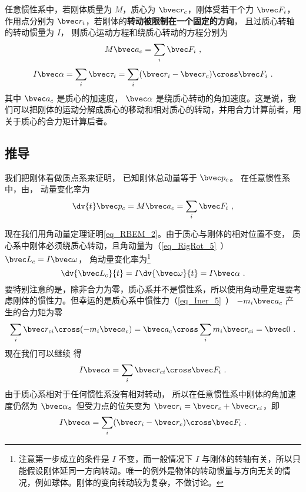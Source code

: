 

任意惯性系中，若刚体质量为 $M$，质心为 $\bvec r_c$，刚体受若干个力 $\bvec F_i$，作用点分别为 $\bvec r_i$，若刚体的\textbf{转动被限制在一个固定的方向}， 且过质心转轴的转动惯量为 $I$， 则质心运动方程和绕质心转动的方程分别为
\begin{equation}\label{eq_RBEM_1}
M\bvec a_c = \sum_i \bvec F_i~,
\end{equation}
\begin{equation}\label{eq_RBEM_2}
I \bvec \alpha = \sum_i \bvec \tau_i = \sum_i (\bvec r_i-\bvec r_c) \cross  \bvec F_i~.
\end{equation}
其中 $\bvec a_c$ 是质心的加速度， $\bvec \alpha$ 是绕质心转动的角加速度。这是说，我们可以把刚体的运动分解成质心的移动和相对质心的转动，并用合力计算前者，用关于质心的合力矩计算后者。

\subsection{推导}
我们把刚体看做质点系来证明， 已知刚体总动量等于 $\bvec p_c$。 在任意惯性系中，由， 动量变化率为
\begin{equation}
\dv{t} \bvec p_c = M \bvec a_c = \sum_i \bvec F_i~,
\end{equation}

现在我们用角动量定理证明\autoref{eq_RBEM_2}。由于质心与刚体的相对位置不变，%
质心系中刚体必须绕质心转动，且角动量为（\autoref{eq_RigRot_5}~） $\bvec L_c = I \bvec\omega$， 角动量变化率为\footnote{注意第一步成立的条件是 $I$ 不变，而一般情况下 $I$ 与刚体的转轴有关，所以只能假设刚体延同一方向转动。唯一的例外是物体的转动惯量与方向无关的情况，例如球体。刚体的变向转动较为复杂，不做讨论。}
\begin{equation}
\dv{\bvec L_c}{t} = I \dv{\bvec \omega}{t} = I \bvec\alpha~.
\end{equation}
要特别注意的是，除非合力为零，质心系并不是惯性系，所以使用角动量定理要考虑刚体的惯性力。但幸运的是质心系中惯性力（\autoref{eq_Iner_5}~） $-m_i \bvec a_c$ 产生的合力矩为零
\begin{equation}
\sum_i \bvec r_{ci}\cross (-m_i \bvec a_{c}) = \bvec a_{c} \cross \sum_i m_i \bvec r_{ci} = \bvec 0~.
\end{equation}
现在我们可以继续 得
\begin{equation}
I \bvec\alpha = \sum_i \bvec r_{ci} \cross  \bvec F_i~.
\end{equation}
由于质心系相对于任何惯性系没有相对转动， 所以在任意惯性系中刚体的角加速度仍然为 $\bvec\alpha$。但受力点的位矢变为 $\bvec r_i = \bvec r_c + \bvec r_{ci}$，即
\begin{equation}\label{eq_RBEM_7}
I \bvec \alpha = \sum_i (\bvec r_i-\bvec r_c) \cross  \bvec F_i~.
\end{equation}

